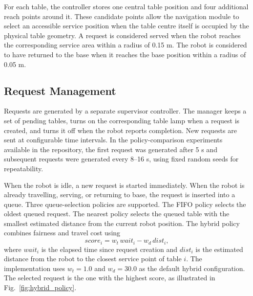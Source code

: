 \documentclass[conference]{IEEEtran}
\begin{document}
For each table, the controller stores one central table position and four
additional reach points around it. These candidate points allow the navigation
module to select an accessible service position when the table centre itself is
occupied by the physical table geometry. A request is considered served when
the robot reaches the corresponding service area within a radius of 0.15 m.
The robot is considered to have returned to the base when it reaches the base
position within a radius of 0.05 m.


\subsection{Request Management}

Requests are generated by a separate supervisor controller. The manager keeps a
set of pending tables, turns on the corresponding table lamp when a request is
created, and turns it off when the robot reports completion. New requests are
sent at configurable time intervals. In the policy-comparison experiments
available in the repository, the first request was generated after 5 s and
subsequent requests were generated every 8--16 s, using fixed random seeds for
repeatability.

When the robot is idle, a new request is started immediately. When the robot is
already travelling, serving, or returning to base, the request is inserted into
a queue. Three queue-selection policies are supported. The FIFO policy selects
the oldest queued request. The nearest policy selects the queued table with the
smallest estimated distance from the current robot position. The hybrid policy
combines fairness and travel cost using
\begin{equation}
score_i = w_t\,wait_i - w_d\,dist_i,
\end{equation}
where $wait_i$ is the elapsed time since request creation and $dist_i$ is the
estimated distance from the robot to the closest service point of table $i$.
The implementation uses $w_t=1.0$ and $w_d=30.0$ as the default hybrid
configuration. The selected request is the one with the highest score, as
illustrated in Fig.~\ref{fig:hybrid_policy}.
\end{document}
